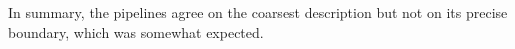 \documentclass[prl,twocolumn]{revtex4-1}
\begin{document}
In summary, the pipelines agree on the coarsest description but not on its precise boundary, which was somewhat expected. 
%
%

%
%
\end{document}
